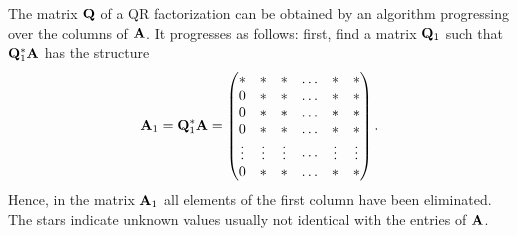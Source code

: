 \begin{intro}
  \label{intro:ortho:1}
  The matrix $\mathbf Q$ of a QR factorization can be obtained by an
  algorithm progressing over the columns of $\mathbf A$. It progresses as
  follows: first, find a matrix $\mathbf Q_1$ such that $\mathbf Q_1^*\mathbf A$
  has the structure
  \begin{gather}
    \mathbf A_1 = \mathbf Q_1^* \mathbf A =
    \begin{pmatrix}
      * & * & * & \dots & * & * \\
      0 & * & * & \dots & * & * \\
      0 & * & * & \dots & * & * \\
      0 & * & * & \dots & * & * \\
      \vdots & \vdots & \vdots & \cdots & \vdots & \vdots \\
      0 & * & * & \dots & * & *
    \end{pmatrix}.
  \end{gather}
  Hence, in the matrix $\mathbf A_1$ all elements of the first column have
  been eliminated. The stars indicate unknown values usually not
  identical with the entries of $\mathbf A$.


\end{intro}
